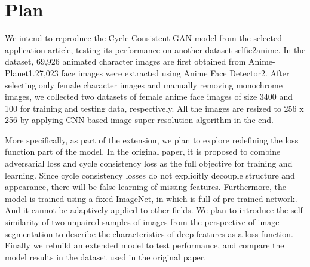 \section{Plan}

We intend to reproduce the Cycle-Consistent GAN model from the selected application article\cite{zhu_unpaired_2017}, testing its performance on another dataset-\href{https://paperswithcode.com/dataset/selfie2anime}{selfie2anime}.
In the dataset, 69,926 animated character images are first obtained from Anime-Planet1.27,023 face images were extracted using Anime Face Detector2. 
After selecting only female character images and manually removing monochrome images, we collected two datasets of female anime face images of size 3400 and 100 for training and testing data, respectively. 
All the images are resized to 256 x 256 by applying CNN-based image super-resolution algorithm in the end.

More specifically, as part of the extension, we plan to explore redefining the loss function part of the model. 
In the original paper, it is proposed to combine adversarial loss and cycle consistency loss as the full objective for training and learning. 
Since cycle consistency losses do not explicitly decouple structure and appearance, there will be false learning of missing features. 
Furthermore, the model is trained using a fixed ImageNet, in which is full of pre-trained network. 
And it cannot be adaptively applied to other fields. 
We plan to introduce the self similarity of two unpaired samples of images from the perspective of image segmentation to describe the characteristics of deep features as a loss function. \cite{chuanxia2021}
Finally we rebuild an extended model to test performance, and compare the model results in the dataset used in the original paper.
